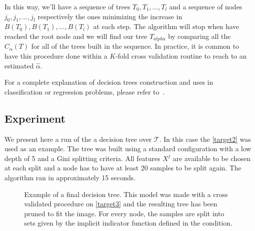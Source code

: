 In this way, we'll have a sequence of trees $T_0,T_1,\ldots,T_l$ and a sequence of nodes $j_0, j_1,\ldots,j_l$ respectively the ones minimizing the increase in $B(T_0),B(T_1),\ldots,B(T_l)$ at each step. The algorithm will stop when have reached the root node and we will find our tree $T_{alpha}$ by comparing all the $C_\alpha(T)$ for all of the trees built in the sequence. In practice, it is common to have this procedure done within a $K$-fold cross validation routine to reach to an estimated $\hat{\alpha}$.

For a complete explanation of decision trees construction and uses in classification or regression problems, please refer to~\cite{breiman-cart84}.

\subsection{Experiment}\label{subsection:decision_trees_experiment}

We present here a run of the a decision tree over $\mathcal{T}$.
In this case the \cref{target2} was used as an example.
The tree was built using a standard configuration with a low depth of 5 and a Gini splitting criteria.
All features $X^j$ are available to be chosen at each split and a node has to have at least 20 samples to be split again. The algorithm ran in approximately 15 seconds.


\bigskip


\begin{figure}
	\centering
	\caption{ Example of a final decision tree. This model was made with a cross validated procedure on \cref{target3} and the resulting tree has been pruned to fit the image. For every node, the samples are split into sets given by the implicit indicator function defined in the condition.}
	\label{fig:decision_tree_actual_problem}
\end{figure}



